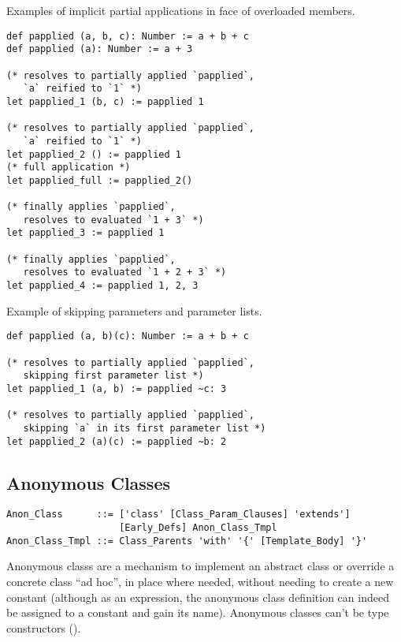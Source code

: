 \example Examples of implicit partial applications in face of overloaded members. 
\begin{lstlisting}
def papplied (a, b, c): Number := a + b + c
def papplied (a): Number := a + 3

(* resolves to partially applied `papplied`, 
   `a` reified to `1` *)
let papplied_1 (b, c) := papplied 1

(* resolves to partially applied `papplied`, 
   `a` reified to `1` *)
let papplied_2 () := papplied 1
(* full application *)
let papplied_full := papplied_2() 

(* finally applies `papplied`, 
   resolves to evaluated `1 + 3` *)
let papplied_3 := papplied 1

(* finally applies `papplied`, 
   resolves to evaluated `1 + 2 + 3` *)
let papplied_4 := papplied 1, 2, 3
\end{lstlisting}

\example Example of skipping parameters and parameter lists. 
\begin{lstlisting}
def papplied (a, b)(c): Number := a + b + c

(* resolves to partially applied `papplied`, 
   skipping first parameter list *)
let papplied_1 (a, b) := papplied ~c: 3

(* resolves to partially applied `papplied`, 
   skipping `a` in its first parameter list *)
let papplied_2 (a)(c) := papplied ~b: 2
\end{lstlisting}






\subsection{Anonymous Classes}
\label{sec:anonymous-classes}

\syntax\begin{lstlisting}
Anon_Class      ::= ['class' [Class_Param_Clauses] 'extends'] 
                    [Early_Defs] Anon_Class_Tmpl
Anon_Class_Tmpl ::= Class_Parents 'with' '{' [Template_Body] '}'
\end{lstlisting}

Anonymous classs are a mechanism to implement an abstract class or override a concrete class ``ad hoc'', in place where needed, without needing to create a new constant (although as an expression, the anonymous class definition can indeed be assigned to a constant and gain its name). Anonymous classes can't be type constructors (). 

